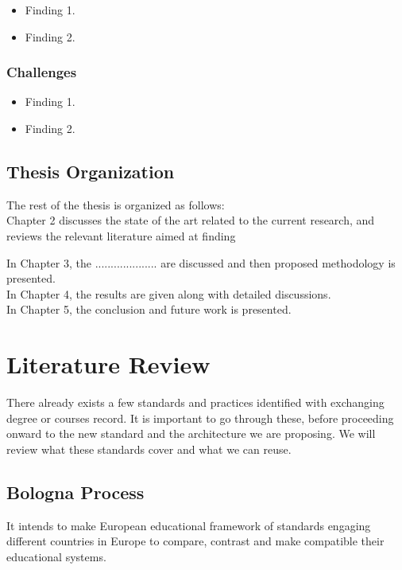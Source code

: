 \documentclass[12pt,a4paper,oneside]{book}
\begin{document}
\begin{itemize}
\item
Finding 1.
\item
Finding 2.
\end{itemize}

\subsection{Challenges}

\begin{itemize}
\item
Finding 1.
\item
Finding 2.
\end{itemize}

\section{Thesis Organization}\label{s-thesis-organization}

The rest of the thesis is organized as follows: \\

Chapter 2 discusses the state of the art related to the current research, and reviews the relevant literature aimed at finding

In Chapter 3, the .................... are discussed and then proposed methodology is presented. \\

In Chapter 4, the results are given along with detailed discussions. \\

In Chapter 5, the conclusion and future work is presented.

\chapter{Literature Review}\label{ch-work}

There already exists a few standards and practices identified with exchanging degree or courses record. It is important to go through these, before proceeding onward to the new standard and the architecture we are proposing. We will review what these standards cover and what we can reuse.

\section{Bologna Process}

It intends to make European educational framework of standards engaging different countries in Europe to compare, contrast and make compatible their educational systems. \cite{bologna process}
\end{document}
